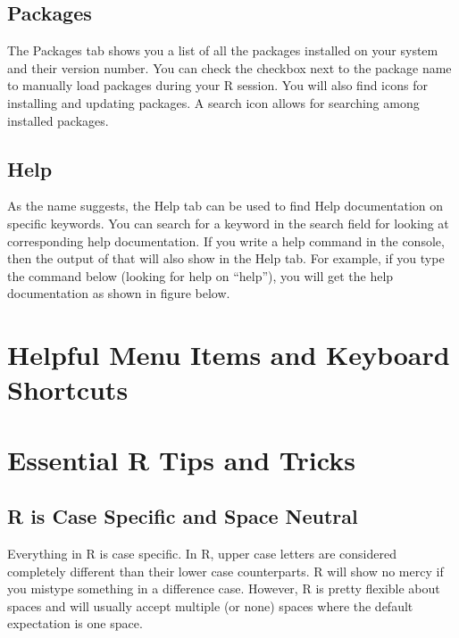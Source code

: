 \documentclass[]{krantz}
\makeatletter
\newenvironment{Shaded}{\begin{snugshade}}{\end{snugshade}}
\newcommand{\KeywordTok}[1]{\textcolor[rgb]{0.27,0.27,0.27}{\textbf{#1}}}
\newcommand{\StringTok}[1]{\textcolor[rgb]{0.5,0.5,0.5}{#1}}
\newcommand{\CommentTok}[1]{\textcolor[rgb]{0.56,0.35,0.01}{\textit{#1}}}
\newcommand{\NormalTok}[1]{#1}
\newenvironment{kframe}{%
\medskip{}
\setlength{\fboxsep}{.8em}
 \def\at@end@of@kframe{}%
 \ifinner\ifhmode%
  \def\at@end@of@kframe{\end{minipage}}%
  \begin{minipage}{\columnwidth}%
 \fi\fi%
 \def\FrameCommand##1{\hskip\@totalleftmargin \hskip-\fboxsep
 \colorbox{shadecolor}{##1}\hskip-\fboxsep
     \hskip-\linewidth \hskip-\@totalleftmargin \hskip\columnwidth}%
 \MakeFramed {\advance\hsize-\width
   \@totalleftmargin\z@ \linewidth\hsize
   \@setminipage}}%
 {\par\unskip\endMakeFramed%
 \at@end@of@kframe}
\renewenvironment{Shaded}{\begin{kframe}}{\end{kframe}}
\theoremstyle{definition}
\theoremstyle{definition}
\theoremstyle{definition}
\theoremstyle{remark}
\makeatother
\begin{document}
\subsection{Packages}\label{packages}

The Packages tab shows you a list of all the packages installed on your
system and their version number. You can check the checkbox next to the
package name to manually load packages during your R session. You will
also find icons for installing and updating packages. A search icon
allows for searching among installed packages.

\subsection{Help}\label{help}

As the name suggests, the Help tab can be used to find Help
documentation on specific keywords. You can search for a keyword in the
search field for looking at corresponding help documentation. If you
write a help command in the console, then the output of that will also
show in the Help tab. For example, if you type the command below
(looking for help on ``help''), you will get the help documentation as
shown in figure below.

\begin{Shaded}
\end{Shaded}

\section{Helpful Menu Items and Keyboard
Shortcuts}\label{helpful-menu-items-and-keyboard-shortcuts}

\section{Essential R Tips and Tricks}\label{essential-r-tips-and-tricks}

\subsection{R is Case Specific and Space
Neutral}\label{r-is-case-specific-and-space-neutral}

Everything in R is case specific. In R, upper case letters are
considered completely different than their lower case counterparts. R
will show no mercy if you mistype something in a difference case.
However, R is pretty flexible about spaces and will usually accept
multiple (or none) spaces where the default expectation is one space.
\end{document}
